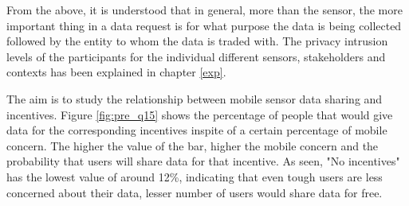 From the above, it is understood that in general, more than the sensor, the more important thing in a data request is for what purpose the data is being collected followed by the entity to whom the data is traded with. The privacy intrusion levels of the participants for the individual different sensors, stakeholders and contexts has been explained in chapter \ref{exp}.

The aim is to study the relationship between mobile sensor data sharing and incentives. Figure \ref{fig:pre_q15} shows the percentage of people that would give data for the corresponding incentives inspite of a certain percentage of mobile concern. The higher the value of the bar, higher the mobile concern and the probability that users will share data for that incentive. As seen, "No incentives" has the lowest value of around 12\%, indicating that even tough users are less concerned about their data, lesser number of users would share data for free.

%

%

